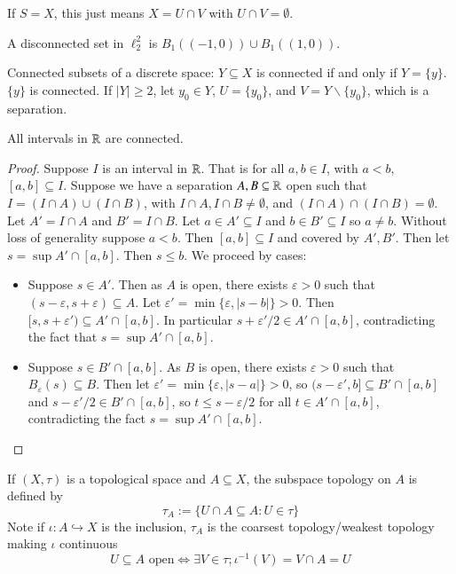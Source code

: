 If $S = X$, this just means $X = U\cap V$ with $U\cap V = \emptyset$.

\begin{eg}
    A disconnected set in $\ell_2^2$ is $B_1((-1,0)) \cup B_1((1,0))$.
\end{eg}

\begin{eg}
    Connected subsets of a discrete space: $Y \subseteq X$ is connected if and only if $Y = \{y\}$. $\{y\}$ is connected. If $|Y| \geq 2$, let $y_0 \in Y$, $U = \{y_0\}$, and $V = Y\backslash \{y_0\}$, which is a separation.
\end{eg}


\begin{prop}\label{prop:3.1.6}
    All intervals in $\mathbb R$ are connected.
\end{prop}
\begin{proof}
    Suppose $I$ is an interval in $\mathbb R$. That is for all $a, b \in I$, with $a < b$, $[a,b] \subseteq I$. Suppose we have a separation $A, B \subseteq \mathbb R$ open such that $I = (I\cap A)\cup(I\cap B)$, with $I\cap A,I\cap B \neq \emptyset$, and $(I\cap A)\cap (I\cap B) = \emptyset$. Let $A' = I\cap A$ and $B' = I\cap B$. Let $a \in A' \subseteq I$ and $b \in B' \subseteq I$ so $a \neq b$. Without loss of generality suppose $a < b$. Then $[a,b] \subseteq I$ and covered by $A',B'$. Then let $s = \sup A'\cap [a,b]$. Then $s \leq b$. We proceed by cases:
    \begin{itemize}
        \item Suppose $s \in A'$. Then as $A$ is open, there exists $\varepsilon > 0$ such that $(s-\varepsilon,s+\varepsilon) \subseteq A$. Let $\varepsilon' = \min\{\varepsilon,|s-b|\} > 0$. Then $[s,s+\varepsilon') \subseteq A'\cap [a,b]$. In particular $s+\varepsilon'/2 \in A'\cap [a,b]$, contradicting the fact that $s = \sup A'\cap [a,b]$.
        \item Suppose $s \in B'\cap [a,b]$. As $B$ is open, there exists $\varepsilon > 0$ such that $B_{\varepsilon}(s) \subseteq B$. Then let $\varepsilon' = \min\{\varepsilon,|s-a|\} > 0$, so $(s-\varepsilon',b] \subseteq B'\cap [a,b]$ and $s - \varepsilon'/2 \in B'\cap [a,b]$, so $t \leq s-\varepsilon/2$ for all $t \in A'\cap [a,b]$, contradicting the fact $s = \sup A'\cap [a,b]$.
    \end{itemize}
\end{proof}

\begin{defn}
    If $(X,\tau)$ is a topological space and $A \subseteq X$, the subspace topology on $A$ is defined by \begin{equation*}
        \tau_A := \{U\cap A \subseteq A: U \in \tau\}
    \end{equation*}
    Note if $\iota:A\hookrightarrow X$ is the inclusion, $\tau_A$ is the coarsest topology/weakest topology making $\iota$ continuous $$U \subseteq A\text{ open} \iff \exists V \in \tau;\iota^{-1}(V) = V\cap A = U$$
\end{defn}

